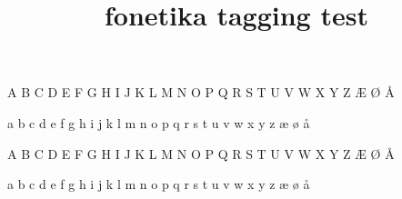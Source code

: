 \documentclass{article}
\title{fonetika tagging test}
\begin{document}
\fonetikaseriffamily
A B C D E F G H I J K L M N O P Q R S T U V W X Y Z Æ Ø Å

a b c d e f g h i j k l m n o p q r s t u v w x y z æ ø å

\fonetikasansfamily
A B C D E F G H I J K L M N O P Q R S T U V W X Y Z Æ Ø Å

a b c d e f g h i j k l m n o p q r s t u v w x y z æ ø å
\end{document}
